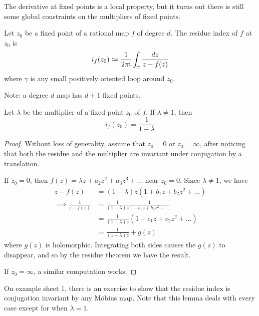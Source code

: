 \documentclass[10pt,a4paper]{article}
\begin{document}
The derivative at fixed points is a local property, but it turns out there is still some global constraints on the multipliers of fixed points.
\begin{definition}
  Let $z_0$ be a fixed point of a rational map $f$ of degree $d$. The residue index of $f$ at $z_0$ is
  \[ i_f(z_0) \coloneqq \frac{1}{2\pi\mathfrak{i}}\int_\gamma \frac{dz}{z-f(z)}\]
  where $\gamma$ is any small positively oriented loop around $z_0$.
\end{definition}
Note: a degree $d$ map has $d+1$ fixed points.
\begin{lemma}
  Let $\lambda$ be the multiplier of a fixed point $z_0$ of $f$. If $\lambda \neq 1$, then
  \[i_f(z_0) = \frac{1}{1-\lambda}\]
\end{lemma}
\begin{proof}
  Without loss of generality, assume that $z_0 = 0$ or $z_0 = \infty$, after noticing that both the residue and the multiplier are invariant under conjugation by a translation.

  If $z_0 = 0$, then $f(z) = \lambda z + a_2z^2 + a_3z^3 + \ldots$ near $z_0=0$. Since $\lambda \neq 1$, we have
  \begin{align*}
    z-f(z) &= (1-\lambda)z(1+b_1z+b_2z^2+\ldots)\\
    \implies \frac{1}{z-f(z)} &= \frac{1}{(1-\lambda)z}\frac{1}{1+b_1z+b_2z^2+\ldots}\\
    &= \frac{1}{(1-\lambda)z}(1+c_1z+c_2z^2+\ldots)\\
    &= \frac{1}{(1-\lambda)z} + g(z)
  \end{align*}
  where $g(z)$ is holomorphic. Integrating both sides causes the $g(z)$ to disappear, and so by the residue theorem we have the result.

  If $z_0 = \infty$, a similar computation works.
\end{proof}
On example sheet 1, there is an exercise to show that the residue index is conjugation invariant by any M\"obius map. Note that this lemma deals with every case except for when $\lambda = 1$.
\end{document}
